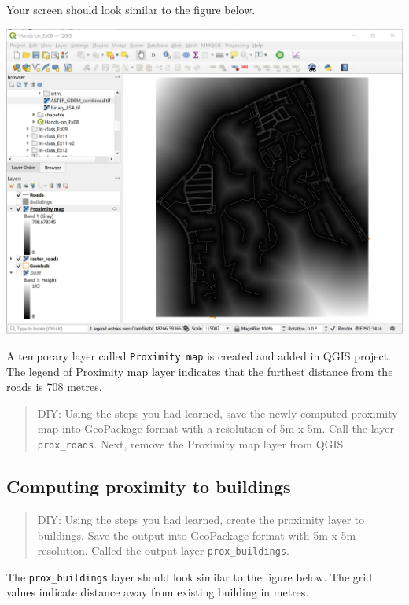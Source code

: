 \documentclass[
  letterpaper,
  DIV=11,
  numbers=noendperiod]{scrreprt}
\begin{document}
Your screen should look similar to the figure below.

\includegraphics{./img07/image27.jpg}

A temporary layer called \texttt{Proximity\ map} is created and added in
QGIS project. The legend of Proximity map layer indicates that the
furthest distance from the roads is 708 metres.

\begin{quote}
DIY: Using the steps you had learned, save the newly computed proximity
map into GeoPackage format with a resolution of 5m x 5m. Call the layer
\texttt{prox\_roads}. Next, remove the Proximity map layer from QGIS.
\end{quote}

\hypertarget{computing-proximity-to-buildings}{%
\subsection{Computing proximity to
buildings}\label{computing-proximity-to-buildings}}

\begin{quote}
DIY: Using the steps you had learned, create the proximity layer to
buildings. Save the output into GeoPackage format with 5m x 5m
resolution. Called the output layer \texttt{prox\_buildings}.
\end{quote}

The \texttt{prox\_buildings} layer should look similar to the figure
below. The grid values indicate distance away from existing building in
metres.
\end{document}
